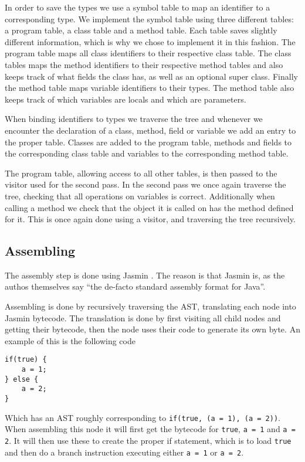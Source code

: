 \documentclass[a4paper]{article}
\begin{document}
In order to save the types we use a symbol table to map an identifier to a
corresponding type. We implement the symbol table using three different
tables: a program table, a class table and a method table. Each table saves
slightly different information, which is why we chose to implement it in this
fashion. The program table maps all class identifiers to their respective class
table. The class tables maps the method identifiers to their respective method
tables and also keeps track of what fields the class has, as well as an optional
super class. Finally the method table maps variable identifiers to their types.
The method table also keeps track of which variables are locals and which are
parameters.

When binding identifiers to types we traverse the tree and whenever we encounter
the declaration of a class, method, field or variable we add an entry to the
proper table. Classes are added to the program table, methods and fields to the
corresponding class table and variables to the corresponding method table.

The program table, allowing access to all other tables, is then passed to the
visitor used for the second pass. In the second pass we once again traverse the
tree, checking that all operations on variables is correct. Additionally when
calling a method we check that the object it is called on has the method defined
for it. This is once again done using a visitor, and traversing the tree
recursively.

\subsection{Assembling}

The assembly step is done using Jasmin \cite{jasmin}. The reason is that
Jasmin is, as the authos themselves say ``the de-facto standard assembly format for Java''.

Assembling is done by recursively traversing the AST, translating each node into Jasmin
bytecode. The translation is done by first visiting all child nodes and getting their
bytecode, then the node uses their code to generate its own byte. An example of
this is the following code

\begin{lstlisting}
if(true) {
    a = 1;
} else {
    a = 2;
}
\end{lstlisting}

Which has an AST  roughly corresponding to \texttt{if(true, (a = 1), (a = 2))}.
When assembling this node it will first get the bytecode for \texttt{true}, \texttt{a = 1}
and \texttt{a = 2}. It will then use these to create the proper if statement, which is
to load \texttt{true} and then do a branch instruction executing either \texttt{a = 1} or
\texttt{a = 2}.
\end{document}

